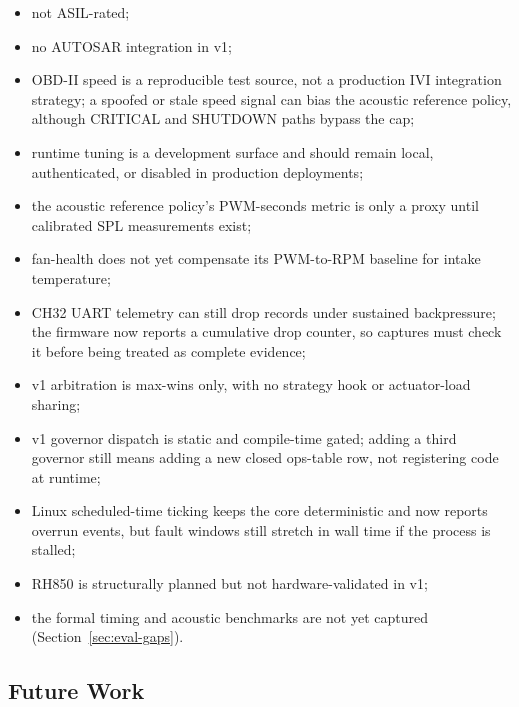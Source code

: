 \begin{itemize}[leftmargin=*]
    \item not ASIL-rated;
    \item no AUTOSAR integration in v1;
    \item OBD-II speed is a reproducible test source, not a production IVI integration strategy; a spoofed or stale speed signal can bias the acoustic reference policy, although CRITICAL and SHUTDOWN paths bypass the cap;
    \item runtime tuning is a development surface and should remain local, authenticated, or disabled in production deployments;
    \item the acoustic reference policy's PWM-seconds metric is only a proxy until calibrated SPL measurements exist;
    \item fan-health does not yet compensate its PWM-to-RPM baseline for intake temperature;
    \item CH32 UART telemetry can still drop records under sustained backpressure; the firmware now reports a cumulative drop counter, so captures must check it before being treated as complete evidence;
    \item v1 arbitration is max-wins only, with no strategy hook or actuator-load sharing;
    \item v1 governor dispatch is static and compile-time gated; adding a third governor still means adding a new closed ops-table row, not registering code at runtime;
    \item Linux scheduled-time ticking keeps the core deterministic and now reports overrun events, but fault windows still stretch in wall time if the process is stalled;
    \item RH850 is structurally planned but not hardware-validated in v1;
    \item the formal timing and acoustic benchmarks are not yet captured (Section~\ref{sec:eval-gaps}).
\end{itemize}

\subsection{Future Work}


